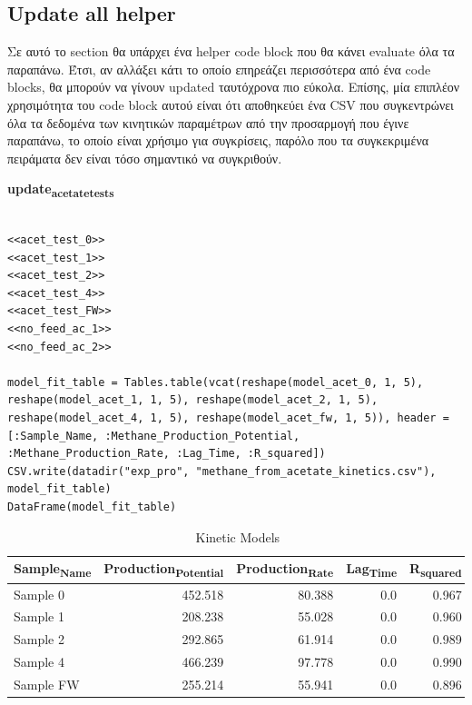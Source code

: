 \documentclass[11pt]{article}
\begin{document}
\subsection{Update all helper}
\label{sec:orgfec0fba}
Σε αυτό το section θα υπάρχει ένα helper code block που θα κάνει evaluate όλα τα παραπάνω. Έτσι, αν αλλάξει κάτι το οποίο επηρεάζει περισσότερα από ένα code blocks, θα μπορούν να γίνουν updated ταυτόχρονα πιο εύκολα. Επίσης, μία επιπλέον χρησιμότητα του code block αυτού είναι ότι αποθηκεύει ένα CSV που συγκεντρώνει όλα τα δεδομένα των κινητικών παραμέτρων από την προσαρμογή που έγινε παραπάνω, το οποίο είναι χρήσιμο για συγκρίσεις, παρόλο που τα συγκεκριμένα πειράματα δεν είναι τόσο σημαντικό να συγκριθούν.

\textbf{update\textsubscript{acetate}\textsubscript{tests}}
\begin{verbatim}

<<acet_test_0>>
<<acet_test_1>>
<<acet_test_2>>
<<acet_test_4>>
<<acet_test_FW>>
<<no_feed_ac_1>>
<<no_feed_ac_2>>

model_fit_table = Tables.table(vcat(reshape(model_acet_0, 1, 5), reshape(model_acet_1, 1, 5), reshape(model_acet_2, 1, 5), reshape(model_acet_4, 1, 5), reshape(model_acet_fw, 1, 5)), header = [:Sample_Name, :Methane_Production_Potential, :Methane_Production_Rate, :Lag_Time, :R_squared])
CSV.write(datadir("exp_pro", "methane_from_acetate_kinetics.csv"), model_fit_table)
DataFrame(model_fit_table)

\end{verbatim}

\begin{table}[htbp]
\caption{Kinetic Models}
\centering
\begin{tabular}{lrrrr}
Sample\textsubscript{Name} & Production\textsubscript{Potential} & Production\textsubscript{Rate} & Lag\textsubscript{Time} & R\textsubscript{squared}\\[0pt]
\hline
Sample 0 & 452.518 & 80.388 & 0.0 & 0.967\\[0pt]
Sample 1 & 208.238 & 55.028 & 0.0 & 0.960\\[0pt]
Sample 2 & 292.865 & 61.914 & 0.0 & 0.989\\[0pt]
Sample 4 & 466.239 & 97.778 & 0.0 & 0.990\\[0pt]
Sample FW & 255.214 & 55.941 & 0.0 & 0.896\\[0pt]
\end{tabular}
\end{table}
\end{document}
